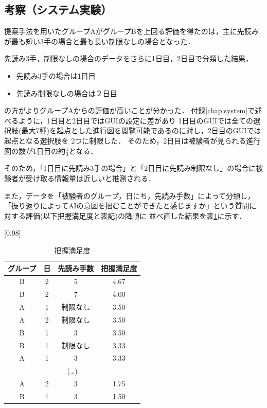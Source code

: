 \subsection{考察（システム実験）}


提案手法を用いたグループAがグループBを上回る評価を得たのは，主に先読みが最も短い3手の場合と最も長い制限なしの場合となった．

先読み3手，制限なしの場合のデータをさらに1日目，2日目で分類した結果，
\begin{itemize}
    \item 先読み3手の場合は1日目
    \item 先読み制限なしの場合は２日目
\end{itemize}

の方がよりグループAからの評価が高いことが分かった．
付録\ref{chap:system}で述べるように，1日目と2日目ではGUIの設定に差があり
1日目のGUIでは全ての選択肢(最大7種)を起点とした進行図を閲覧可能であるのに対し，2日目のGUIでは起点となる選択肢を
2つに制限した．
そのため，2日目は被験者が見られる進行図の数が1日目の約$\frac{1}{3}$となる．

そのため，「1日目に先読み3手の場合」と「2日目に先読み制限なし」の場合に被験者が受け取る情報量は近しいと推測される．

また，データを「被験者のグループ，日にち，先読み手数」によって分類し，「振り返りによってAIの意図を掴むことができたと感じますか」という質問に対する評価(以下把握満足度と表記)の降順に
並べ直した結果を表\ref{table:order}に示す．
\begin{table}[H]
	\caption{把握満足度}
    \label{table:order}
    \scriptsize
	\centering
	\scalebox{0.98}[0.98]{
		\begin{tabular}{c|c|c||c}
			グループ& 日 & 先読み手数 &把握満足度 \\ \hline
			B & 2 & 5 & 4.67\\
            B & 2 & 7 & 4.00\\
            A & 1 & 制限なし& 3.50\\
            A & 2 & 制限なし& 3.50\\
            B & 1 & 3& 3.50\\
            B & 1 & 制限なし& 3.33\\
            A & 1 & 3& 3.33\\
            \multicolumn{4}{c}{(\ldots)}\\
            A & 2 & 3 & 1.75\\
            B & 1 & 3 & 1.50\\

		\end{tabular}
	}
	
\end{table}

